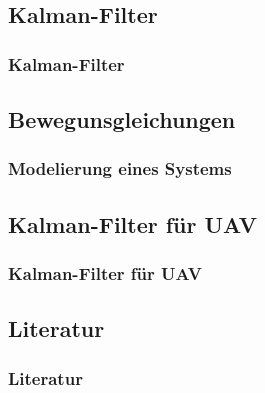 \documentclass[10pt,a4paper,oneside]{beamer}
\begin{document}

\begin{frame}
  \section{Kalman-Filter}
  \frametitle{Kalman-Filter}
\end{frame}

\begin{frame}
  \section{Bewegunsgleichungen}
  \frametitle{Modelierung eines Systems}
\end{frame}

\begin{frame}
  \section{Kalman-Filter für UAV}
  \frametitle{Kalman-Filter für UAV}
\end{frame}

\begin{frame}
  \section{Literatur}
  \frametitle{Literatur}
\printbibliography

\end{frame}
\end{document}
